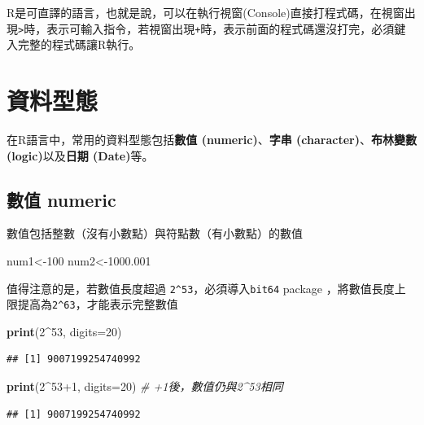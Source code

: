 \documentclass[]{book}
\newenvironment{Shaded}{\begin{snugshade}}{\end{snugshade}}
\newcommand{\KeywordTok}[1]{\textcolor[rgb]{0.13,0.29,0.53}{\textbf{{#1}}}}
\newcommand{\DataTypeTok}[1]{\textcolor[rgb]{0.13,0.29,0.53}{{#1}}}
\newcommand{\DecValTok}[1]{\textcolor[rgb]{0.00,0.00,0.81}{{#1}}}
\newcommand{\FloatTok}[1]{\textcolor[rgb]{0.00,0.00,0.81}{{#1}}}
\newcommand{\CommentTok}[1]{\textcolor[rgb]{0.56,0.35,0.01}{\textit{{#1}}}}
\newcommand{\NormalTok}[1]{{#1}}
\theoremstyle{definition}
\theoremstyle{definition}
\theoremstyle{remark}
\begin{document}
R是可直譯的語言，也就是說，可以在執行視窗(Console)直接打程式碼，在視窗出現\texttt{\textgreater{}}時，表示可輸入指令，若視窗出現\texttt{+}時，表示前面的程式碼還沒打完，必須鍵入完整的程式碼讓R執行。

\section{資料型態}\label{DataType}

在R語言中，常用的資料型態包括\textbf{數值 (numeric)}、\textbf{字串
(character)}、\textbf{布林變數 (logic)}以及\textbf{日期 (Date)}等。

\subsection{數值 numeric}\label{-numeric}

數值包括整數（沒有小數點）與符點數（有小數點）的數值

\begin{Shaded}
\begin{Highlighting}[]
\NormalTok{num1<-}\DecValTok{100} 
\NormalTok{num2<-}\FloatTok{1000.001}
\end{Highlighting}
\end{Shaded}

值得注意的是，若數值長度超過 \texttt{2\^{}53}，必須導入\texttt{bit64}
package
\citep{R-bit64}，將數值長度上限提高為\texttt{2\^{}63}，才能表示完整數值

\begin{Shaded}
\begin{Highlighting}[]
\KeywordTok{print}\NormalTok{(}\DecValTok{2}\NormalTok{^}\DecValTok{53}\NormalTok{, }\DataTypeTok{digits=}\DecValTok{20}\NormalTok{) }
\end{Highlighting}
\end{Shaded}

\begin{verbatim}
## [1] 9007199254740992
\end{verbatim}

\begin{Shaded}
\begin{Highlighting}[]
\KeywordTok{print}\NormalTok{(}\DecValTok{2}\NormalTok{^}\DecValTok{53+1}\NormalTok{, }\DataTypeTok{digits=}\DecValTok{20}\NormalTok{) }\CommentTok{# +1後，數值仍與2^53相同}
\end{Highlighting}
\end{Shaded}

\begin{verbatim}
## [1] 9007199254740992
\end{verbatim}
\end{document}
